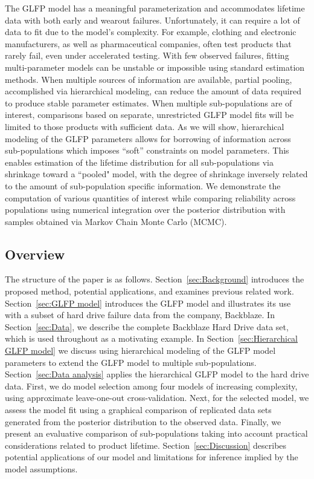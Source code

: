 \documentclass[11pt]{article}
\begin{document}
The GLFP model has a meaningful parameterization and accommodates lifetime data with both early and wearout failures.  Unfortunately, it can require a lot of data to fit due to the model's complexity.  For example, clothing and electronic manufacturers, as well as pharmaceutical companies, often test products that rarely fail, even under accelerated testing.  With few observed failures, fitting multi-parameter models can be unstable or impossible using standard estimation methods.  When multiple sources of information are available, partial pooling, accomplished via hierarchical modeling, can reduce the amount of data required to produce stable parameter estimates. When multiple sub-populations are of interest, comparisons based on separate, unrestricted GLFP model fits will be limited to those products with sufficient data. As we will show, hierarchical modeling of the GLFP parameters allows for borrowing of information across sub-populations which imposes ``soft'' constraints on model parameters. This enables estimation of the lifetime distribution for all sub-populations via shrinkage toward a ``pooled" model, with the degree of shrinkage inversely related to the amount of sub-population specific information. We demonstrate the computation of various quantities of interest while comparing reliability across populations using numerical integration over the posterior distribution with samples obtained via Markov Chain Monte Carlo (MCMC).

\subsection{Overview}
The structure of the paper is as follows. Section~\ref{sec:Background} introduces the proposed method, potential applications, and examines previous related work.  Section~\ref{sec:GLFP model} introduces the GLFP model and illustrates its use with a subset of hard drive failure data from the company, Backblaze.  In Section~\ref{sec:Data}, we describe the complete Backblaze Hard Drive data set, which is used throughout as a motivating example. In Section~\ref{sec:Hierarchical GLFP model} we discuss using hierarchical modeling of the GLFP model parameters to extend the GLFP model to multiple sub-populations. Section~\ref{sec:Data analysis} applies the hierarchical GLFP model to the hard drive data. First, we do model selection among four models of increasing complexity, using approximate leave-one-out cross-validation. Next, for the selected model, we assess the model fit using a graphical comparison of replicated data sets generated from the posterior distribution to the observed data. Finally, we present an evaluative comparison of sub-populations taking into account practical considerations related to product lifetime. Section~\ref{sec:Discussion} describes potential applications of our model and limitations for inference implied by the model assumptions.
\end{document}
